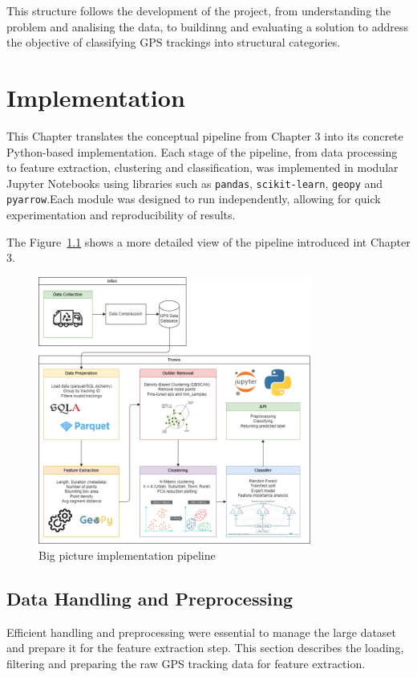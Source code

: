 \documentclass[a4paper,12pt,twoside]{scrreprt}
\begin{document}
This structure follows the development of the project, from understanding the
problem and analising the data, to buildinng and evaluating a solution to
address the objective of classifying GPS trackings into structural categories.
\chapter{Implementation}

This Chapter translates the conceptual pipeline from Chapter 3 into its
concrete Python-based implementation.
Each stage of the pipeline, from data processing to feature extraction,
clustering and classification, was implemented in modular Jupyter Notebooks
using libraries such as \texttt{pandas}, \texttt{scikit-learn}, \texttt{geopy}
and \texttt{pyarrow}.Each module was designed to run independently, allowing
for quick
experimentation and reproducibility of results.

The
Figure~\ref{fig:big_picture_implemetation_diagram} shows a more detailed view
of the pipeline introduced int Chapter 3.

\begin{figure}[htbp]
  \centering

  \includegraphics[width=0.8\textwidth]{Diagrams/drawio/big_picture_implementation.png}
  \caption{Big picture implementation pipeline}
  \label{fig:big_picture_implemetation_diagram}
\end{figure}
\FloatBarrier

\section{Data Handling and Preprocessing}
Efficient handling and preprocessing were essential to manage the large dataset
and prepare it for the feature extraction step.
This section describes the loading, filtering and preparing the raw GPS
tracking data for feature extraction.
\end{document}
